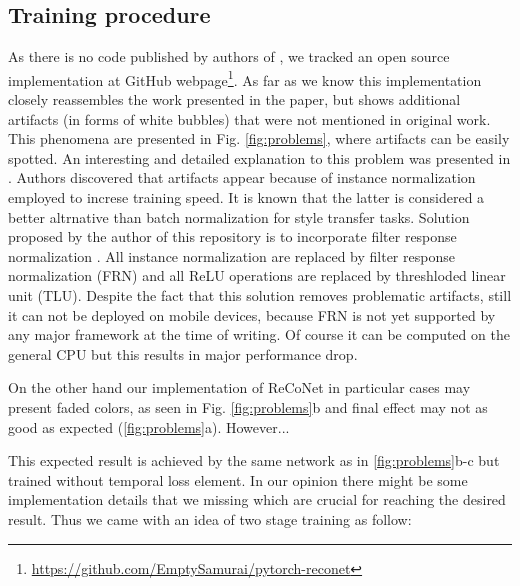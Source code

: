 \documentclass[a4paper,conference]{IEEEtran}
\begin{document}


\subsection{Training procedure}

As there is no code published by authors of \cite{Reconet}, we tracked an open source implementation at GitHub webpage\footnote{\url{https://github.com/EmptySamurai/pytorch-reconet}}. As far as we know this implementation closely reassembles the work presented in the paper, but shows additional artifacts (in forms of white bubbles) that were not mentioned in original work. This phenomena are presented in Fig. \ref{fig:problems}, where artifacts can be easily spotted. An interesting and detailed explanation to this problem was presented in \cite{karras2019analyzing}. Authors discovered that artifacts appear because of instance normalization employed to increse training speed. It is known that the latter is considered a better altrnative than batch normalization \cite{instanceNormalization} for style transfer tasks. Solution proposed by the author of this repository is to incorporate filter response normalization \cite{FRNlayer}. All instance normalization are replaced by filter response normalization (FRN) and all ReLU operations are replaced by threshloded linear unit (TLU). Despite the fact that this solution removes problematic artifacts, still it can not be deployed on mobile devices, because FRN is not yet supported by any major framework at the time of writing. Of course it can be computed on the general CPU but this results in major performance drop.

On the other hand our implementation of ReCoNet in particular cases may present faded colors, as seen in Fig. \ref{fig:problems}b and final effect may not as good as expected (\ref{fig:problems}a). However... 

This expected result is achieved by the same network as in \ref{fig:problems}b-c but trained without temporal loss element. In our opinion there might be some implementation details that we missing which are crucial for reaching the desired result. Thus we came with an idea of two stage training as follow:
\end{document}
